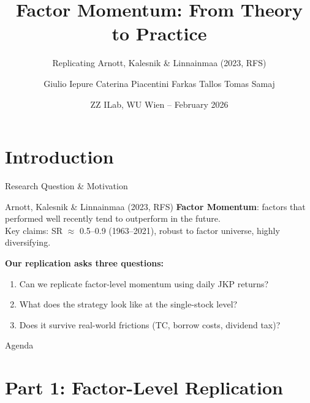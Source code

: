 \documentclass[
  ignorenonframetext,
  aspectratio=169]{beamer}
\title{Factor Momentum: From Theory to Practice}
\subtitle{Replicating Arnott, Kalesnik \& Linnainmaa (2023, RFS)}
\author{Giulio Iepure \textbar{} Caterina Piacentini \textbar{} Farkas
Tallos \textbar{} Tomas Samaj}
\date{ZZ ILab, WU Wien -- February 2026}
\begin{document}
\frame{\titlepage}

\section{Introduction}\label{introduction}

\begin{frame}{Research Question \& Motivation}
\label{research-question-motivation}
\begin{block}{Arnott, Kalesnik \& Linnainmaa (2023, RFS)}
\textbf{Factor Momentum}: factors that performed well recently tend to outperform in the future.\\
\medskip
Key claims: SR $\approx$ 0.5--0.9 (1963--2021), robust to factor universe, highly diversifying.
\end{block}

\bigskip

\textbf{Our replication asks three questions:}

\begin{enumerate}
\item[\textbf{P1}] Can we replicate factor-level momentum using daily JKP returns?
\item[\textbf{P2}] What does the strategy look like at the single-stock level?
\item[\textbf{P2}] Does it survive real-world frictions (TC, borrow costs, dividend tax)?
\end{enumerate}
\end{frame}

\begin{frame}{Agenda}
\label{agenda}
\tableofcontents[hideallsubsections]
\end{frame}

\section{Part 1: Factor-Level
Replication}\label{part-1-factor-level-replication}
\end{document}
